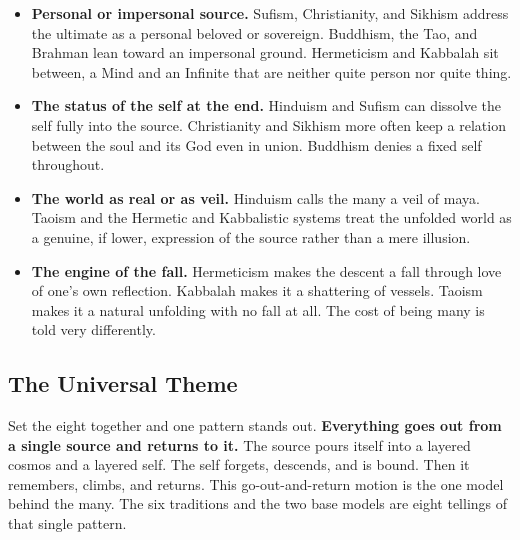 \begin{itemize}
 \item \textbf{Personal or impersonal source.} Sufism, Christianity, and Sikhism address the ultimate as a personal beloved or sovereign. Buddhism, the Tao, and Brahman lean toward an impersonal ground. Hermeticism and Kabbalah sit between, a Mind and an Infinite that are neither quite person nor quite thing.
 \item \textbf{The status of the self at the end.} Hinduism and Sufism can dissolve the self fully into the source. Christianity and Sikhism more often keep a relation between the soul and its God even in union. Buddhism denies a fixed self throughout.
 \item \textbf{The world as real or as veil.} Hinduism calls the many a veil of maya. Taoism and the Hermetic and Kabbalistic systems treat the unfolded world as a genuine, if lower, expression of the source rather than a mere illusion.
 \item \textbf{The engine of the fall.} Hermeticism makes the descent a fall through love of one's own reflection. Kabbalah makes it a shattering of vessels. Taoism makes it a natural unfolding with no fall at all. The cost of being many is told very differently.
\end{itemize}

\subsection{The Universal Theme}

Set the eight together and one pattern stands out. \textbf{Everything goes out from a single source and returns to it.} The source pours itself into a layered cosmos and a layered self. The self forgets, descends, and is bound. Then it remembers, climbs, and returns. This go-out-and-return motion is the one model behind the many. The six traditions and the two base models are eight tellings of that single pattern.
